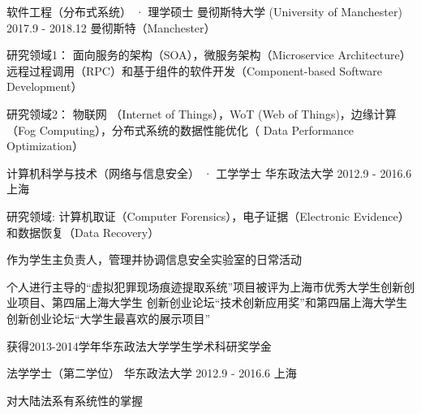 \begin{cventries}
  \cventry
    {软件工程（分布式系统） · 理学硕士}
    {曼彻斯特大学 (University of Manchester)}
    {2017.9 - 2018.12}
    {曼彻斯特（Manchester）}
    {
      \begin{cvitems}
        \item {研究领域1： 面向服务的架构（SOA），微服务架构（Microservice Architecture）远程过程调用（RPC）和基于组件的软件开发（Component-based Software Development）}
          \item {研究领域2： 物联网 （Internet of Things），WoT (Web of Things)，边缘计算（Fog Computing），分布式系统的数据性能优化（ Data Performance Optimization）}
      \end{cvitems}
    }
    
  \cventry
    {计算机科学与技术（网络与信息安全） · 工学学士}
    {华东政法大学}
    {2012.9 - 2016.6}
    { 上海}
    {
      \begin{cvitems}
        \item {研究领域:  计算机取证（Computer Forensics），电子证据（Electronic Evidence）和数据恢复（Data Recovery）}
        \item { 作为学生主负责人，管理并协调信息安全实验室的日常活动}
        \item {个人进行主导的“虚拟犯罪现场痕迹提取系统”项目被评为上海市优秀大学生创新创业项目、第四届上海大学生 创新创业论坛“技术创新应用奖”和第四届上海大学生创新创业论坛“大学生最喜欢的展示项目”}
        \item {获得2013-2014学年华东政法大学学生学术科研奖学金}
      \end{cvitems}
    }
    
  \cventry
    {法学学士（第二学位）}
    {华东政法大学}
{2012.9 - 2016.6}
    { 上海}
    {
      \begin{cvitems}
        \item { 对大陆法系有系统性的掌握}
      \end{cvitems}
    }
\end{cventries}
